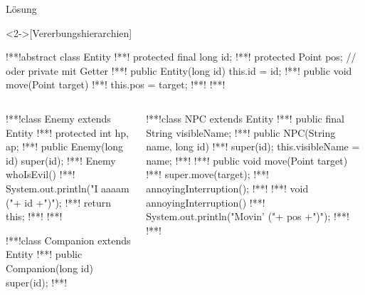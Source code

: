 \begin{frame}[c,fragile]{Lösung}
\begin{solve}<2->[Vererbungshierarchien]
%
\begin{plainjava}[morekeywords={[3]{Entity}},belowskip=0pt,aboveskip=0pt]
!**!abstract class Entity {
!**!    protected final long id;
!**!    protected Point pos; // oder private mit Getter
!**!    public Entity(long id) { this.id = id; }
!**!    public void move(Point target) {
!**!        this.pos = target;
!**!    }
!**!}
\end{plainjava}
\begin{columns}[c]
%
\begin{column}{.45\linewidth}
\begin{plainjava}[morekeywords={[3]{Enemy,Companion,Entity}},belowskip=0pt,aboveskip=0pt]
!**!class Enemy extends Entity {
!**!  protected int hp, ap;
!**!  public Enemy(long id) { super(id); }
!**!  Enemy whoIsEvil() {
!**!    System.out.println("I aaaam ("+ id +")");
!**!    return this;
!**!  }
!**!}

!**!class Companion extends Entity {
!**!  public Companion(long id) { super(id); }
!**!}
\end{plainjava}
\end{column}
\begin{column}{.45\linewidth}
\begin{plainjava}[morekeywords={[3]{NPC,Entity}},belowskip=0pt,aboveskip=0pt]
!**!class NPC extends Entity {
!**!  public final String visibleName;
!**!  public NPC(String name, long id) {
!**!    super(id); this.visibleName = name;
!**!  }
!**!  public void move(Point target) {
!**!    super.move(target);
!**!    annoyingInterruption();
!**!  }
!**!  void annoyingInterruption() {
!**!    System.out.println("Movin' ("+ pos +")");
!**!  }
!**!}
\end{plainjava}
\end{column}
\end{columns}
\end{solve}
\end{frame}


